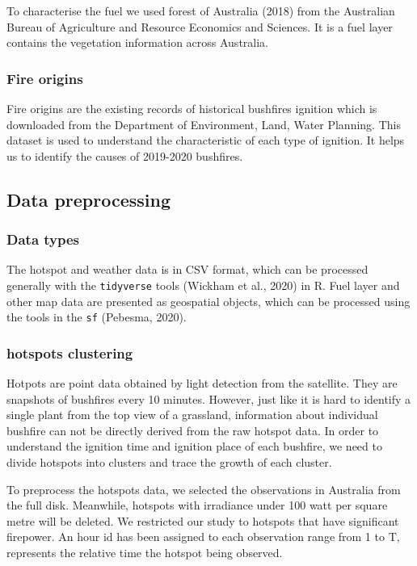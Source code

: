 \documentclass[11pt,a4paper,]{article}
\begin{document}
To characterise the fuel we used forest of Australia (2018) from the
Australian Bureau of Agriculture and Resource Economics and Sciences. It
is a fuel layer contains the vegetation information across Australia.

\subsubsection{Fire origins}\label{fire-origins}

Fire origins are the existing records of historical bushfires ignition
which is downloaded from the Department of Environment, Land, Water
Planning. This dataset is used to understand the characteristic of each
type of ignition. It helps us to identify the causes of 2019-2020
bushfires.

\subsection{Data preprocessing}\label{data-preprocessing}

\subsubsection{Data types}\label{data-types}

The hotspot and weather data is in CSV format, which can be processed
generally with the \texttt{tidyverse} tools (Wickham et al., 2020) in R.
Fuel layer and other map data are presented as geospatial objects, which
can be processed using the tools in the \texttt{sf} (Pebesma, 2020).

\subsubsection{hotspots clustering}\label{hotspots-clustering}

Hotpots are point data obtained by light detection from the satellite.
They are snapshots of bushfires every 10 minutes. However, just like it
is hard to identify a single plant from the top view of a grassland,
information about individual bushfire can not be directly derived from
the raw hotspot data. In order to understand the ignition time and
ignition place of each bushfire, we need to divide hotspots into
clusters and trace the growth of each cluster.

To preprocess the hotspots data, we selected the observations in
Australia from the full disk. Meanwhile, hotspots with irradiance under
100 watt per square metre will be deleted. We restricted our study to
hotspots that have significant firepower. An hour id has been assigned
to each observation range from 1 to T, represents the relative time the
hotspot being observed.
\end{document}
